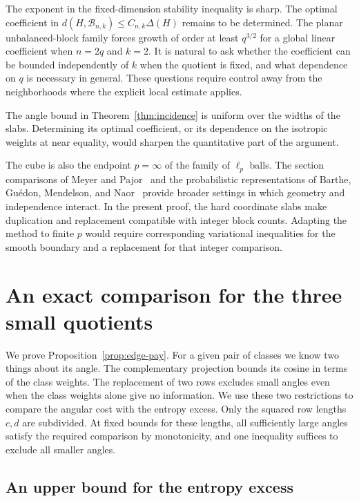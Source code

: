 \documentclass[11pt,a4paper]{article}
\theoremstyle{remark}\newtheorem{remark}[theorem]{Remark}
\numberwithin{equation}{section}
\begin{document}
The exponent in the fixed-dimension stability inequality is sharp.
The optimal coefficient in
$d(H,\mathcal B_{n,k})\le C_{n,k}\Delta(H)$ remains to be determined. The planar
unbalanced-block family forces growth of order at least $q^{3/2}$ for
a global linear coefficient when $n=2q$ and $k=2$. It is natural to ask
whether the coefficient can be bounded independently of $k$ when the
quotient is fixed, and what dependence on $q$ is necessary in general.
These questions require control away from the neighborhoods where the
explicit local estimate applies.

The angle bound in Theorem~\ref{thm:incidence} is uniform over the
widths of the slabs. Determining its optimal coefficient, or its
dependence on the isotropic weights at near equality, would sharpen the
quantitative part of the argument.

The cube is also the endpoint $p=\infty$ of the family of $\ell_p$ balls.
The section comparisons of Meyer and Pajor~\cite{MeyerPajor1988} and the
probabilistic representations of Barthe, Gu\'edon, Mendelson, and
Naor~\cite{BGMN2005} provide broader settings in which geometry and
independence interact. In the present proof, the hard coordinate slabs
make duplication and replacement compatible with integer block counts.
Adapting the method to finite $p$ would require corresponding
variational inequalities for the smooth boundary and a replacement for
that integer comparison.

\appendix
\section{An exact comparison for the three small quotients}
\label{sec:comparisons}

We prove Proposition~\ref{prop:edge-pay}. For a given pair of classes
we know two things about its angle. The complementary projection
bounds its cosine in terms of the class weights. The replacement of
two rows excludes small angles even when the class weights alone give
no information. We use these two restrictions to compare the angular
cost with the entropy excess. Only the squared row lengths \(c,d\) are
subdivided. At fixed bounds for these lengths, all sufficiently large
angles satisfy the required comparison by monotonicity, and one
inequality suffices to exclude all smaller angles.

\subsection{An upper bound for the entropy excess}
\end{document}
